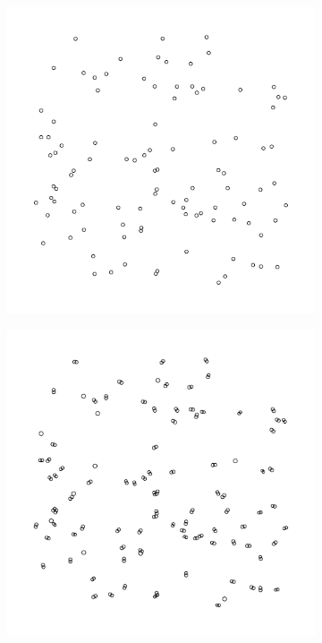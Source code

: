 \documentclass{article}
\begin{document}
\begin{figure}
    \begin{subfigure}{0.49\textwidth}
    \centering
    \includegraphics[width=\linewidth]{../Results/Figures/CellClusters_T=0.pdf}
    \end{subfigure}
    \begin{subfigure}{0.49\textwidth}
        \centering
        \includegraphics[width=\linewidth]{../Results/Figures/CellClusters_T=24.pdf}

\end{subfigure}
\end{figure}
\end{document}
